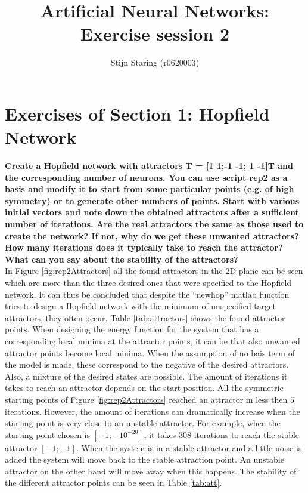 \documentclass[a4paper,10pt]{article}
\title{Artificial Neural Networks: Exercise session 2}
\author{Stijn Staring (r0620003)}
\begin{document}
\selectfont{}

\maketitle


\section{Exercises of Section 1: Hopfield Network}
\textbf{Create a Hopfield network with attractors T = [1 1;-1  -1; 1 -1]T and the corresponding number of neurons. You
	can use script rep2 as a basis and modify it to start from some particular points (e.g. of high symmetry) or to generate
	other numbers of points. Start with various initial vectors and note down the obtained attractors after a sufficient number
	of iterations. Are the real attractors the same as those used to create the network? If not, why do we get these unwanted
	attractors? How many iterations does it typically take to reach the attractor? What can you say about the stability of the
	attractors?}\\

In Figure \ref{fig:rep2Attractors} all the found attractors in the 2D plane can be seen which are more than the three desired ones that were specified to the Hopfield network. It can thus be concluded that despite the ``newhop'' matlab function tries to design a Hopfield network with the minimum of unspecified target attractors, they often occur. Table \ref{tab:attractors} shows the found attractor points. When designing the energy function for the system that has a corresponding local minima at the attractor points, it can be that also unwanted attractor points become local minima. When the assumption of no bais term of the model is made, these correspond to the negative of the desired attractors. Also, a mixture of the desired states are possible. The amount of iterations it takes to reach an attractor depends on the start position. All the symmetric starting points of Figure \ref{fig:rep2Attractors} reached an attractor in less then $ 5 $ iterations. However, the amount of iterations can dramatically increase when the starting point is very close to an unstable attractor. For example, when the starting point chosen is $ [-1;-10^{-20}] $, it takes $ 308 $ iterations to reach the stable attractor $ [-1;-1] $. When the system is in a stable attractor and a little noise is added the system will move back to the stable attraction point. An unstable attractor on the other hand will move away when this happens. The stability of the different attractor points can be seen in Table \ref{tab:att}.\\
\end{document}
